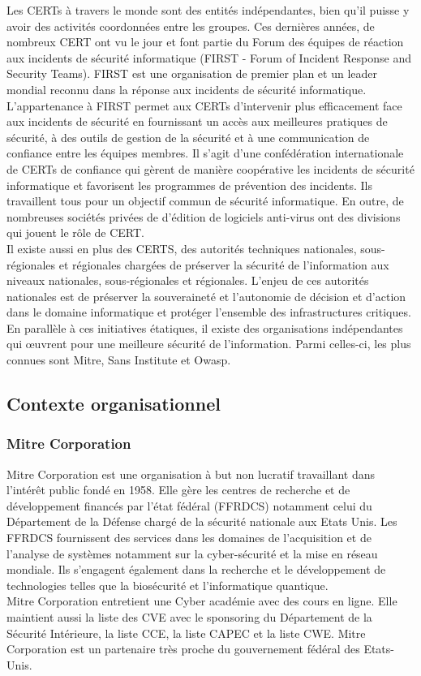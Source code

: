 Les CERTs à travers le monde sont des entités indépendantes, bien qu'il puisse y avoir des activités coordonnées entre les groupes. Ces dernières années, de nombreux CERT ont vu le jour et font partie du Forum des équipes de réaction aux incidents de sécurité informatique (FIRST  - Forum of Incident Response and Security Teams). FIRST est une organisation de premier plan et un leader mondial reconnu dans la réponse aux incidents de sécurité informatique. L'appartenance à FIRST permet aux CERTs d'intervenir plus efficacement face aux incidents de sécurité en fournissant un accès aux meilleures pratiques de sécurité, à des outils de gestion de la sécurité et à une communication de confiance entre les équipes membres. Il s'agit d'une confédération internationale de CERTs de confiance qui gèrent de manière coopérative les incidents de sécurité informatique et favorisent les programmes de prévention des incidents. Ils travaillent tous pour un objectif commun de sécurité informatique. En outre, de nombreuses sociétés privées de d’édition de logiciels anti-virus ont des divisions qui jouent le rôle de CERT.\\
Il existe aussi en plus des CERTS, des autorités techniques nationales, sous-régionales et régionales chargées de préserver la sécurité de l’information aux niveaux nationales, sous-régionales et régionales. L’enjeu de ces autorités nationales est de préserver la souveraineté et l’autonomie de décision et d’action dans le domaine informatique et protéger l’ensemble des infrastructures critiques. \\
En parallèle à ces initiatives étatiques, il existe des organisations indépendantes qui œuvrent pour une meilleure sécurité de l’information. Parmi celles-ci, les plus connues sont Mitre, Sans Institute et Owasp.
\subsection{Contexte organisationnel}
\subsubsection{Mitre Corporation}
Mitre Corporation est une organisation à but non lucratif travaillant dans l’intérêt public fondé en 1958. Elle gère les centres de recherche et de développement financés par l’état fédéral (FFRDCS) notamment celui du Département de la Défense chargé de la sécurité nationale aux Etats Unis. Les FFRDCS fournissent des services dans les domaines de l'acquisition et de l'analyse de systèmes notamment sur la cyber-sécurité et la mise en réseau mondiale. Ils s'engagent également dans la recherche et le développement de technologies telles que la biosécurité et l'informatique quantique.\\
Mitre Corporation entretient une Cyber académie avec des cours en ligne. Elle maintient aussi la liste des CVE avec le sponsoring du Département de la Sécurité Intérieure, la liste CCE, la liste CAPEC et la liste CWE. Mitre Corporation est un partenaire très proche du gouvernement fédéral des Etats-Unis.\\

